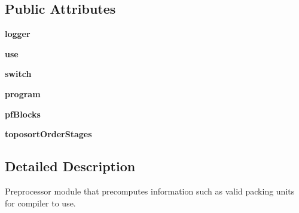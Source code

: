 \subsection*{Public Attributes}
\begin{DoxyCompactItemize}
\item 
\hypertarget{classmapper_1_1src_1_1flexpipe_1_1flexpipe__preprocess_1_1_flexpipe_preprocess_a679e0258d4408d6bd1004810e90778a1}{}{\bfseries logger}\label{classmapper_1_1src_1_1flexpipe_1_1flexpipe__preprocess_1_1_flexpipe_preprocess_a679e0258d4408d6bd1004810e90778a1}

\item 
\hypertarget{classmapper_1_1src_1_1flexpipe_1_1flexpipe__preprocess_1_1_flexpipe_preprocess_ad78b954a892042d9064f2d49a96f2eb5}{}{\bfseries use}\label{classmapper_1_1src_1_1flexpipe_1_1flexpipe__preprocess_1_1_flexpipe_preprocess_ad78b954a892042d9064f2d49a96f2eb5}

\item 
\hypertarget{classmapper_1_1src_1_1flexpipe_1_1flexpipe__preprocess_1_1_flexpipe_preprocess_aeb88c7c16fdd91ea414358dba1c9b643}{}{\bfseries switch}\label{classmapper_1_1src_1_1flexpipe_1_1flexpipe__preprocess_1_1_flexpipe_preprocess_aeb88c7c16fdd91ea414358dba1c9b643}

\item 
\hypertarget{classmapper_1_1src_1_1flexpipe_1_1flexpipe__preprocess_1_1_flexpipe_preprocess_a013b7e54cd194a954ca2c30f3318051e}{}{\bfseries program}\label{classmapper_1_1src_1_1flexpipe_1_1flexpipe__preprocess_1_1_flexpipe_preprocess_a013b7e54cd194a954ca2c30f3318051e}

\item 
\hypertarget{classmapper_1_1src_1_1flexpipe_1_1flexpipe__preprocess_1_1_flexpipe_preprocess_a972ada42d714b0591105218423979d71}{}{\bfseries pf\+Blocks}\label{classmapper_1_1src_1_1flexpipe_1_1flexpipe__preprocess_1_1_flexpipe_preprocess_a972ada42d714b0591105218423979d71}

\item 
\hypertarget{classmapper_1_1src_1_1flexpipe_1_1flexpipe__preprocess_1_1_flexpipe_preprocess_af547d867df37a92d67b2416dd0697b4d}{}{\bfseries toposort\+Order\+Stages}\label{classmapper_1_1src_1_1flexpipe_1_1flexpipe__preprocess_1_1_flexpipe_preprocess_af547d867df37a92d67b2416dd0697b4d}

\end{DoxyCompactItemize}


\subsection{Detailed Description}
\begin{DoxyVerb}Preprocessor module that precomputes information such as valid packing units
for compiler to use.
\end{DoxyVerb}
 

